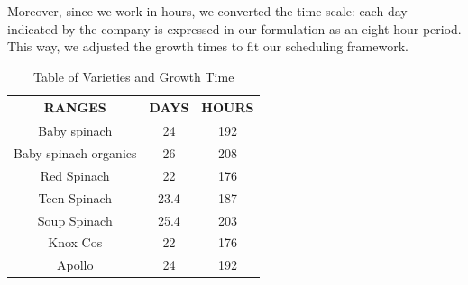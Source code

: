 Moreover, since we work in hours, we converted the time scale: each day indicated by the company is expressed in our formulation as an eight-hour period.  
This way, we adjusted the growth times to fit our scheduling framework.

\begin{table}[ht!]
    \centering
    \begin{minipage}{0.48\textwidth}
        \centering
        \begin{tabular}{|c|c|c|}
            \hline
            \rowcolor{gray!30} \textbf{\textcolor{grey3}{RANGES}} & \textbf{\textcolor{grey3}{DAYS}} &  \textbf{\textcolor{grey3}{HOURS}}\\\hline 
            \hline
            Baby spinach   & 24 & 192 \\ \hline
            Baby spinach organics  & 26 & 208\\ \hline
            Red Spinach              & 22 & 176\\ \hline
            Teen Spinach           & 23.4 & 187\\ \hline
            Soup Spinach & 25.4 & 203 \\ \hline
            Knox Cos     & 22 & 176 \\ \hline
            Apollo      & 24 & 192 \\ 
             
            \hline
        \end{tabular}
        \caption{Table of Varieties and Growth Time}
        \label{tab:Variedades-crecimiento}
    \end{minipage}
    \hfill
\end{table}

